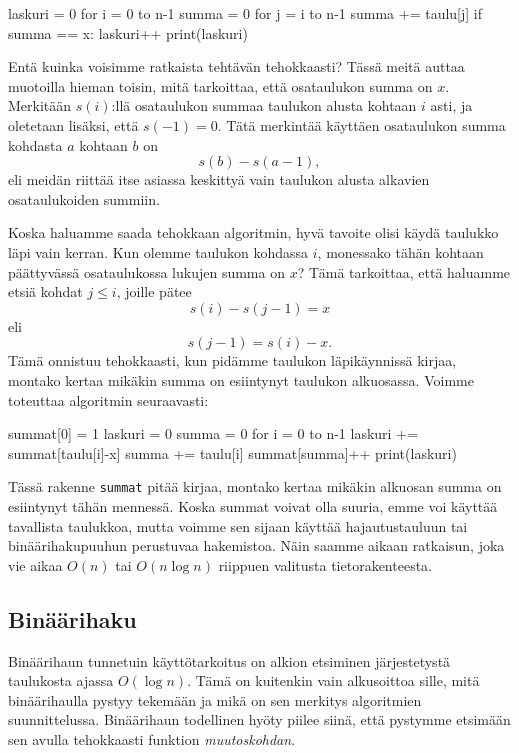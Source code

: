 \begin{code}
laskuri = 0
for i = 0 to n-1
    summa = 0
    for j = i to n-1
        summa += taulu[j]
        if summa == x:
            laskuri++
print(laskuri)
\end{code}

Entä kuinka voisimme ratkaista tehtävän tehokkaasti?
Tässä meitä auttaa muotoilla hieman toisin, mitä tarkoittaa,
että osataulukon summa on $x$.
Merkitään $s(i)$:llä osataulukon summaa taulukon alusta
kohtaan $i$ asti, ja oletetaan lisäksi, että $s(-1)=0$.
Tätä merkintää käyttäen osataulukon summa
kohdasta $a$ kohtaan $b$ on
\[s(b)-s(a-1),\]
eli meidän riittää itse asiassa keskittyä vain taulukon alusta
alkavien osataulukoiden summiin.

Koska haluamme saada tehokkaan algoritmin,
hyvä tavoite olisi käydä taulukko läpi vain kerran.
Kun olemme taulukon kohdassa $i$,
monessako tähän kohtaan päättyvässä osataulukossa
lukujen summa on $x$?
Tämä tarkoittaa, että haluamme etsiä kohdat $j \le i$,
joille pätee
\[s(i)-s(j-1)=x\]
eli
\[s(j-1)=s(i)-x.\]
Tämä onnistuu tehokkaasti, kun pidämme taulukon läpikäynnissä
kirjaa, montako kertaa mikäkin summa on esiintynyt taulukon alkuosassa.
Voimme toteuttaa algoritmin seuraavasti:

\begin{code}
summat[0] = 1
laskuri = 0
summa = 0
for i = 0 to n-1
    laskuri += summat[taulu[i]-x]
    summa += taulu[i]
    summat[summa]++
print(laskuri)
\end{code}

Tässä rakenne \texttt{summat} pitää kirjaa,
montako kertaa mikäkin alkuosan summa on esiintynyt tähän mennessä.
Koska summat voivat olla suuria, emme voi käyttää tavallista taulukkoa,
mutta voimme sen sijaan käyttää hajautustauluun tai binäärihakupuuhun
perustuvaa hakemistoa.
Näin saamme aikaan ratkaisun, joka vie aikaa $O(n)$ tai $O(n \log n)$
riippuen valitusta tietorakenteesta.

\subsection{Binäärihaku}

Binäärihaun tunnetuin käyttötarkoitus on alkion etsiminen
järjestetystä taulukosta ajassa $O(\log n)$.
Tämä on kuitenkin vain alkusoittoa sille,
mitä binää\-rihaulla pystyy tekemään ja mikä on sen
merkitys algoritmien suunnittelussa.
Binääri\-haun todellinen hyöty piilee siinä,
että pystymme etsimään sen avulla tehokkaasti funktion \emph{muutoskohdan}.

